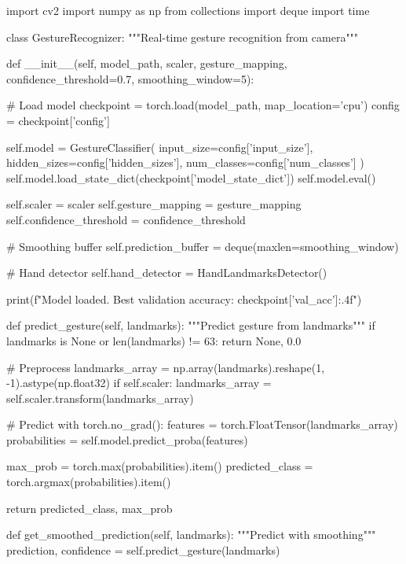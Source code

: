\begin{aivncodebox}
\begin{python}
import cv2
import numpy as np
from collections import deque
import time

class GestureRecognizer:
    """Real-time gesture recognition from camera"""
    
    def __init__(self, model_path, scaler, gesture_mapping, 
                 confidence_threshold=0.7, smoothing_window=5):
        
        # Load model
        checkpoint = torch.load(model_path, map_location='cpu')
        config = checkpoint['config']
        
        self.model = GestureClassifier(
            input_size=config['input_size'],
            hidden_sizes=config['hidden_sizes'],
            num_classes=config['num_classes']
        )
        self.model.load_state_dict(checkpoint['model_state_dict'])
        self.model.eval()
        
        self.scaler = scaler
        self.gesture_mapping = gesture_mapping
        self.confidence_threshold = confidence_threshold
        
        # Smoothing buffer
        self.prediction_buffer = deque(maxlen=smoothing_window)
        
        # Hand detector
        self.hand_detector = HandLandmarksDetector()
        
        print(f"Model loaded. Best validation accuracy: {checkpoint['val_acc']:.4f}")
    
    def predict_gesture(self, landmarks):
        """Predict gesture from landmarks"""
        if landmarks is None or len(landmarks) != 63:
            return None, 0.0
        
        # Preprocess
        landmarks_array = np.array(landmarks).reshape(1, -1).astype(np.float32)
        if self.scaler:
            landmarks_array = self.scaler.transform(landmarks_array)
        
        # Predict
        with torch.no_grad():
            features = torch.FloatTensor(landmarks_array)
            probabilities = self.model.predict_proba(features)
            
            max_prob = torch.max(probabilities).item()
            predicted_class = torch.argmax(probabilities).item()
        
        return predicted_class, max_prob
    
    def get_smoothed_prediction(self, landmarks):
        """Predict with smoothing"""
        prediction, confidence = self.predict_gesture(landmarks)
        

\end{python}
\end{aivncodebox}

